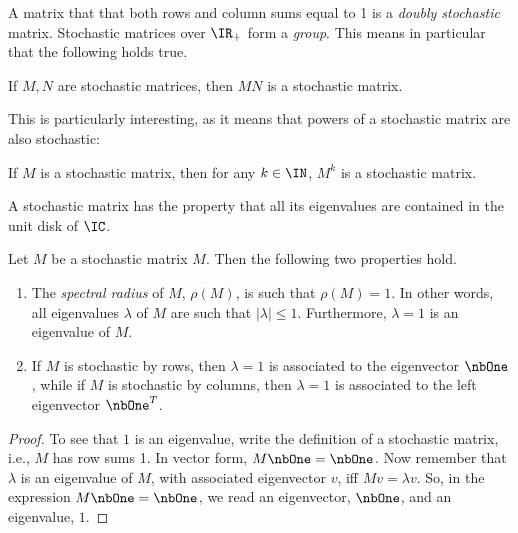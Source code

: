 A matrix that that both rows and column sums equal to 1 is a \emph{doubly stochastic} matrix.
Stochastic matrices over $\IR_+$ form a \emph{group}. This means in particular that the following holds true.
\begin{theorem}
If $M,N$ are stochastic matrices, then $MN$ is a stochastic matrix.
\end{theorem}
This is particularly interesting, as it means that powers of a stochastic matrix are also stochastic:
\begin{theorem}
If $M$ is a stochastic matrix, then for any $k\in\IN$, $M^k$ is a stochastic matrix.
\end{theorem}
A stochastic matrix has the property that all its eigenvalues are contained in the unit disk of $\IC$.
\begin{theorem}
Let $M$ be a stochastic matrix $M$. Then the following two properties hold.
\begin{enumerate}
\item The \emph{spectral radius} of $M$, $\rho(M)$, is such that $\rho(M)=1$. In other words, all eigenvalues $\lambda$ of $M$ are such that $|\lambda|\leq 1$. Furthermore, $\lambda =1$ is an eigenvalue of $M$.
\item If $M$ is stochastic by rows, then $\lambda=1$ is associated to the eigenvector $\nbOne$, while if $M$ is stochastic by columns, then $\lambda=1$ is associated to the left eigenvector $\nbOne^T$.
\end{enumerate}
\end{theorem}
\begin{proof}
To see that $1$ is an eigenvalue, write the definition of a stochastic matrix, i.e., $M$ has row sums 1. In vector form, $M\nbOne=\nbOne$. Now remember that $\lambda$ is an eigenvalue of $M$, with associated eigenvector $v$, iff $Mv=\lambda v$. So, in the expression $M\nbOne=\nbOne$, we read an eigenvector, $\nbOne$, and an eigenvalue, $1$.
\end{proof}






